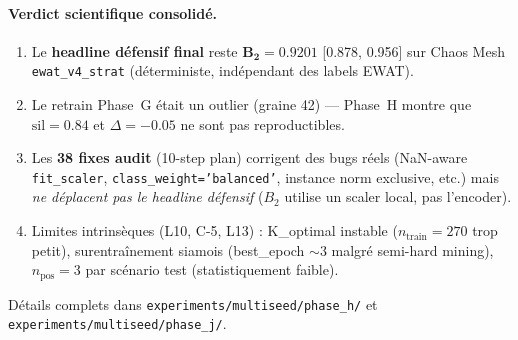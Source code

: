 \paragraph{Verdict scientifique consolidé.}
\begin{enumerate}
  \item Le \textbf{headline défensif final} reste $\mathbf{B_2 = 0.9201}$
    [0.878, 0.956] sur Chaos Mesh \texttt{ewat\_v4\_strat} (déterministe,
    indépendant des labels EWAT).
  \item Le retrain Phase~G était un outlier (graine 42) --- Phase~H montre
    que $\text{sil} = 0.84$ et $\Delta = -0.05$ ne sont pas reproductibles.
  \item Les \textbf{38 fixes audit} (10-step plan) corrigent des bugs réels
    (NaN-aware \texttt{fit\_scaler}, \texttt{class\_weight='balanced'},
    instance norm exclusive, etc.) mais \emph{ne déplacent pas le headline
    défensif} ($B_2$ utilise un scaler local, pas l'encoder).
  \item Limites intrinsèques (L10, C-5, L13) : K\_optimal instable
    ($n_{\text{train}} = 270$ trop petit), surentraînement siamois
    (best\_epoch $\sim 3$ malgré semi-hard mining), $n_{\text{pos}} = 3$
    par scénario test (statistiquement faible).
\end{enumerate}

Détails complets dans \texttt{experiments/multiseed/phase\_h/} et
\texttt{experiments/multiseed/phase\_j/}.

